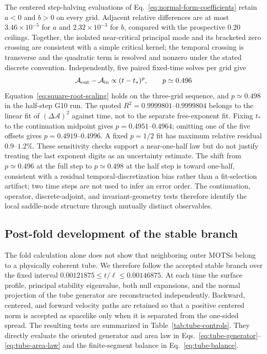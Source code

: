 \documentclass[11pt]{article}
\begin{document}
The centered step-halving evaluations of Eq.~\eqref{eq:normal-form-coefficients}
retain $a<0$ and $b>0$ on every grid.
Adjacent relative differences are at most $3.46\times10^{-5}$ for $a$ and
$2.32\times10^{-3}$ for $b$, compared with the prospective $0.20$ ceilings.
Together, the isolated near-critical principal mode and its bracketed zero
crossing are consistent with a simple critical kernel; the temporal crossing
is transverse and the quadratic term is resolved and nonzero under the stated
discrete convention.  Independently, five paired
fixed-time solves per grid give
\begin{equation}
\mathcal A_{\rm out}-\mathcal A_{\rm in}\propto(t-t_*)^p,
\qquad p\simeq0.496
\label{eq:square-root-scaling}
\end{equation}
Equation~\eqref{eq:square-root-scaling} holds on the three-grid sequence, and
$p\simeq0.498$ in the half-step G10 run.  The
quoted $R^2=0.9999801$--$0.9999804$ belongs to the linear fit of
$(\Delta\mathcal A)^2$ against time, not to the separate free-exponent fit.
Fixing $t_*$ to the continuation midpoint gives $p=0.4951$--$0.4964$; omitting
one of the five offsets gives $p=0.4919$--$0.4996$.  A fixed $p=1/2$ fit has
maximum relative residual $0.9$--$1.2\%$.  These sensitivity checks support a
near-one-half law but do not justify treating the last exponent digits as an
uncertainty estimate.  The shift from $p\simeq0.496$ at the full step to
$p\simeq0.498$ at the half step is toward one-half, consistent with a residual
temporal-discretization bias rather than a fit-selection artifact; two time
steps are not used to infer an error order.  The continuation, operator,
discrete-adjoint, and
invariant-geometry tests therefore identify the local saddle-node structure
through mutually distinct observables.

\subsection{Post-fold development of the stable branch}

The fold calculation alone does not show that neighboring outer MOTSs belong
to a physically coherent tube.  We therefore follow the accepted stable
branch over the fixed interval
$0.00121875\leq t/\ell\leq0.00146875$.  At each time the surface profile,
principal stability eigenvalue, both null expansions, and the normal
projection of the tube generator are reconstructed independently.  Backward,
centered, and forward velocity paths are retained so that a positive centered
norm is accepted as spacelike only when it is separated from the one-sided
spread.  The resulting tests are summarized in
Table~\ref{tab:tube-controls}.  They directly evaluate the oriented generator
and area law in Eqs.~\eqref{eq:tube-generator}--\eqref{eq:tube-area-law} and
the finite-segment balance in Eq.~\eqref{eq:tube-balance}.
\end{document}
